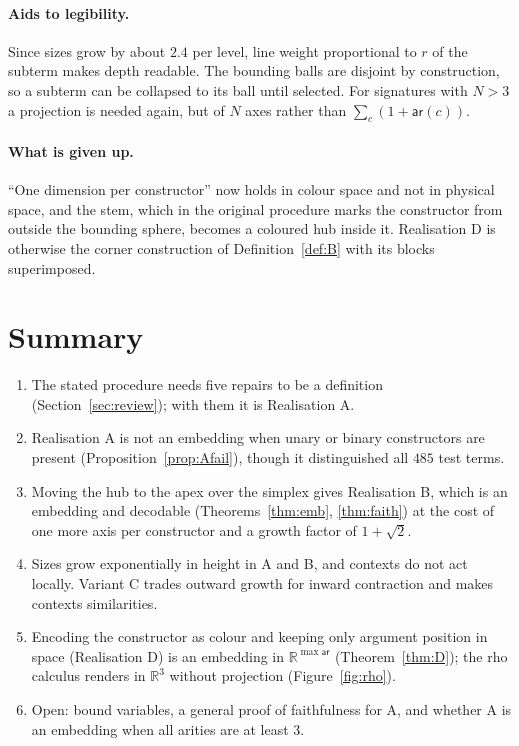 \documentclass[11pt]{article}
\theoremstyle{definition}
\theoremstyle{remark}
\newcommand{\R}{\mathbb{R}}
\newcommand{\ar}{\mathsf{ar}}
\newcommand{\rad}{r}
\begin{document}
\paragraph{Aids to legibility.} Since sizes grow by about $2.4$ per level, line
weight proportional to $\rad$ of the subterm makes depth readable. The bounding
balls are disjoint by construction, so a subterm can be collapsed to its ball
until selected. For signatures with $N>3$ a projection is needed again, but of
$N$ axes rather than $\sum_c(1+\ar(c))$.

\paragraph{What is given up.} ``One dimension per constructor'' now holds in
colour space and not in physical space, and the stem, which in the original
procedure marks the constructor from outside the bounding sphere, becomes a
coloured hub inside it. Realisation D is otherwise the corner construction of
Definition~\ref{def:B} with its blocks superimposed.

\section{Summary}

\begin{enumerate}
\item The stated procedure needs five repairs to be a definition
(Section~\ref{sec:review}); with them it is Realisation A.
\item Realisation A is not an embedding when unary or binary constructors are
present (Proposition~\ref{prop:Afail}), though it distinguished all $485$ test
terms.
\item Moving the hub to the apex over the simplex gives Realisation B, which is an
embedding and decodable (Theorems~\ref{thm:emb}, \ref{thm:faith}) at the cost of
one more axis per constructor and a growth factor of $1+\sqrt2$.
\item Sizes grow exponentially in height in A and B, and contexts do not act
locally. Variant C trades outward growth for inward contraction and makes
contexts similarities.
\item Encoding the constructor as colour and keeping only argument position in
space (Realisation D) is an embedding in $\R^{\max\ar}$
(Theorem~\ref{thm:D}); the rho calculus renders in $\R^3$ without projection
(Figure~\ref{fig:rho}).
\item Open: bound variables, a general proof of faithfulness for A, and whether A
is an embedding when all arities are at least $3$.
\end{enumerate}
\end{document}
